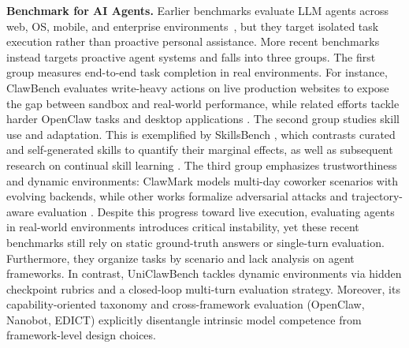 \textbf{Benchmark for AI Agents.}
Earlier benchmarks evaluate LLM agents across web, OS, mobile,
and enterprise environments~\citep{chezelles2024browsergym,drouin2024workarena,koh2024visualwebarena,liu2023agentbench,ma2024agentboard,mialon2023gaia,rawles2024androidworld,xie2024osworld,xu2024theagentcompany,yao2024tau,zhou2023webarena},
but they target isolated task execution rather than proactive personal
assistance. More recent benchmarks instead targets proactive
agent systems and falls into three groups. 
The first group measures end-to-end task completion in real environments. For instance, ClawBench \citep{zhang2026clawbench} evaluates write-heavy actions on live production websites to expose the gap between sandbox and real-world performance, while related efforts tackle harder OpenClaw tasks and desktop applications \citep{long2026liveclawbench,pinchbench2026,macagentbench2026}.
The second group studies skill use and adaptation. This is exemplified by SkillsBench \citep{li2026skillsbench}, which contrasts curated and self-generated skills to quantify their marginal effects, as well as subsequent research on continual skill learning \citep{xia2026metaclaw,ma2026skillclaw}.
The third group emphasizes trustworthiness and dynamic environments: ClawMark \citep{meng2026clawmark} models multi-day coworker scenarios with evolving backends, while other works formalize adversarial attacks and trajectory-aware evaluation \citep{wang2026assistant,ye2026claw}.
Despite this progress toward live execution, evaluating agents in real-world environments introduces critical instability, yet these recent benchmarks still rely on static ground-truth answers or single-turn evaluation. Furthermore, they organize tasks by scenario and lack analysis on agent frameworks. In contrast, UniClawBench tackles dynamic environments via hidden checkpoint rubrics and a closed-loop multi-turn evaluation strategy. Moreover, its capability-oriented taxonomy and cross-framework evaluation (OpenClaw, Nanobot, EDICT) explicitly disentangle intrinsic model competence from framework-level design choices.






